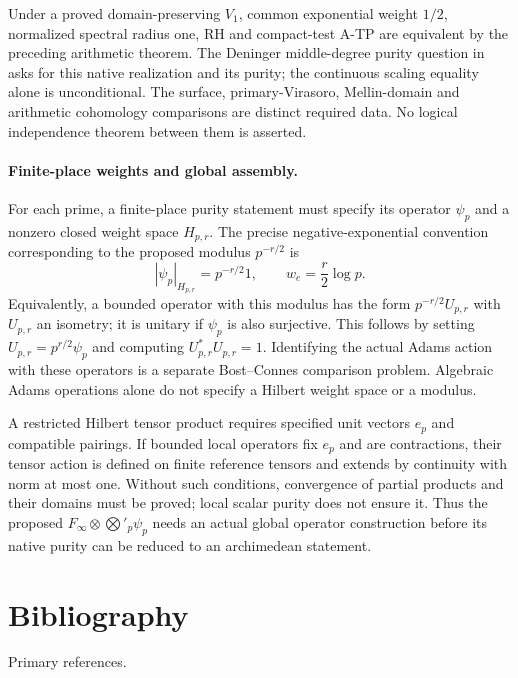 Under a proved domain-preserving $V_1$, common exponential weight
$1/2$, normalized spectral radius one, RH and compact-test A-TP
are equivalent by the preceding arithmetic theorem. The Deninger
middle-degree purity question in
 asks for this native realization
and its purity; the continuous scaling equality alone is unconditional.
The surface, primary-Virasoro, Mellin-domain and arithmetic
cohomology comparisons are distinct required data. No logical
independence theorem between them is asserted.

\paragraph{Finite-place weights and global assembly.}
\label{v4-arith:pres90:finite-place}
For each prime, a finite-place purity statement must specify its
operator $\psi_p$ and a nonzero closed weight space $H_{p,r}$.
The precise negative-exponential convention corresponding to the
proposed modulus $p^{-r/2}$ is
\[
 |\psi_p|_{H_{p,r}}=p^{-r/2}1,
 \qquad w_e=\frac r2\log p.
\]
Equivalently, a bounded operator with this modulus has the form
$p^{-r/2}U_{p,r}$ with $U_{p,r}$ an isometry; it is unitary if
$\psi_p$ is also surjective. This follows by setting
$U_{p,r}=p^{r/2}\psi_p$ and computing $U_{p,r}^*U_{p,r}=1$.
Identifying the actual Adams action with these operators is a
separate Bost--Connes comparison problem. Algebraic Adams operations
alone do not specify a Hilbert weight space or a modulus.

A restricted Hilbert tensor product requires specified unit vectors
$e_p$ and compatible pairings. If bounded local operators fix $e_p$
and are contractions, their tensor action is defined on finite
reference tensors and extends by continuity with norm at most one.
Without such conditions, convergence of partial products and their
domains must be proved; local scalar purity does not ensure it.
Thus the proposed $F_\infty\otimes\bigotimes'_p\psi_p$ needs an
actual global operator construction before its native purity can
be reduced to an archimedean statement.

\section{Bibliography}
\label{v4-arith:w9-r2:bibliography}

Primary references.

